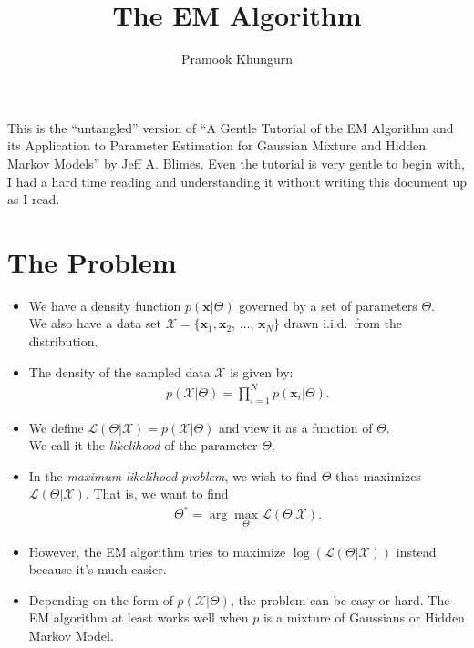 \documentclass[10pt]{article}
\title{The EM Algorithm}
\author{Pramook Khungurn}
\newcommand{\ve}[1]{\mathbf{#1}}
\newcommand{\mcal}[1]{\mathcal{#1}}
\newcommand{\likelihood}{\mathcal{L}}
\newcommand{\X}{\mathcal{X}}
\begin{document}
	\maketitle	
	
	This is the ``untangled'' version of ``A Gentle Tutorial of the EM Algorithm and its Application to Parameter Estimation for Gaussian Mixture and Hidden Markov Models'' by Jeff A. Blimes. Even the tutorial is very gentle to begin with, I had a hard time reading and understanding it without writing this document up as I read.
	
	\section{The Problem}
	
	\begin{itemize}
	  \item We have a density function $p(\ve{x}|\Theta)$ governed by a set of parameters $\Theta$.\\
	  We also have a data set $\mathcal{X} = \{ \ve{x}_1, \ve{x}_2$, $\dotsc$, $\ve{x}_N \}$ drawn i.i.d.~from the distribution.
	  
	  \item The density of the sampled data $\mathcal{X}$ is given by:
	  \begin{align*}
	    p(\mathcal{X}|\Theta) = \prod_{i=1}^N p(\ve{x}_i|\Theta).
    \end{align*}
    
    \item We define $\likelihood(\Theta|\mcal{X}) = p(\mcal{X}|\Theta)$ and view it as a function of $\Theta$.\\ We call it the \emph{likelihood} of the parameter $\Theta$.
    
    \item In the \emph{maximum likelihood problem}, we wish to find $\Theta$ that maximizes $\likelihood(\Theta|\X)$. That is, we want to find
    \begin{align*}
      \Theta^* = \arg\max_\Theta \likelihood(\Theta|\X).
    \end{align*}
    
    \item However, the EM algorithm tries to maximize $\log(\likelihood(\Theta|\X))$ instead because it's much easier.
    
    \item Depending on the form of $p(\X|\Theta)$, the problem can be easy or hard. The EM algorithm at least works well when $p$ is a mixture of Gaussians or Hidden Markov Model.	  
  \end{itemize}
  
\end{document}
